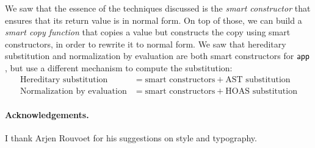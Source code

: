 We saw that the essence of the techniques discussed is the \emph{smart constructor} that ensures that its return value is in normal form.
On top of those, we can build a \emph{smart copy function} that copies a value but constructs the copy using smart constructors, in order to rewrite it to normal form.
We saw that hereditary substitution and normalization by evaluation are both smart constructors for $\mathsf{app}$, but use a different mechanism to compute the substitution:
\begin{align*}
  \text{Hereditary substitution} &= \text{smart constructors} + \text{AST substitution} \\
  \text{Normalization by evaluation} &= \text{smart constructors} + \text{HOAS substitution}
\end{align*}

\paragraph{Acknowledgements.} I thank Arjen Rouvoet for his suggestions on style and typography.





